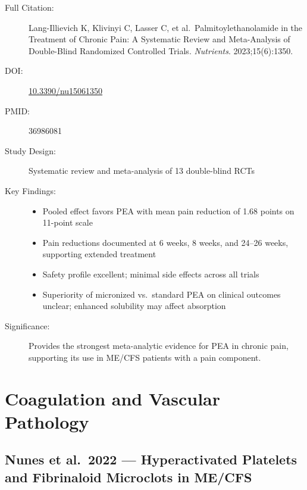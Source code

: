 \begin{description}
    \item[Full Citation:] Lang-Illievich K, Klivinyi C, Lasser C, et al.\ Palmitoylethanolamide in the Treatment of Chronic Pain: A Systematic Review and Meta-Analysis of Double-Blind Randomized Controlled Trials. \textit{Nutrients}. 2023;15(6):1350.
    \item[DOI:] \href{https://doi.org/10.3390/nu15061350}{10.3390/nu15061350}
    \item[PMID:] 36986081
    \item[Study Design:] Systematic review and meta-analysis of 13 double-blind RCTs
    \item[Key Findings:]
    \begin{itemize}
        \item Pooled effect favors PEA with mean pain reduction of 1.68 points on 11-point scale
        \item Pain reductions documented at 6 weeks, 8 weeks, and 24--26 weeks, supporting extended treatment
        \item Safety profile excellent; minimal side effects across all trials
        \item Superiority of micronized vs.\ standard PEA on clinical outcomes unclear; enhanced solubility may affect absorption
    \end{itemize}
    \item[Significance:] Provides the strongest meta-analytic evidence for PEA in chronic pain, supporting its use in ME/CFS patients with a pain component.
\end{description}

\section{Coagulation and Vascular Pathology}
\label{sec:bib-coagulation-vascular}

\subsection{Nunes et al.\ 2022 --- Hyperactivated Platelets and Fibrinaloid Microclots in ME/CFS}

